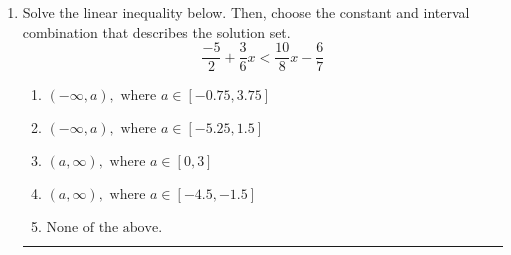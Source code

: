 \documentclass[14pt]{extbook}
\newcommand{\litem}[1]{\item#1\hspace*{-1cm}\rule{\textwidth}{0.4pt}}
\begin{document}
\begin{enumerate}
{\begin{enumerate}[label=\Alph*.]
\end{enumerate} }
\litem{
Solve the linear inequality below. Then, choose the constant and interval combination that describes the solution set.\[ \frac{-5}{2} + \frac{3}{6} x < \frac{10}{8} x - \frac{6}{7} \]\begin{enumerate}[label=\Alph*.]
\item \( (-\infty, a), \text{ where } a \in [-0.75, 3.75] \)
\item \( (-\infty, a), \text{ where } a \in [-5.25, 1.5] \)
\item \( (a, \infty), \text{ where } a \in [0, 3] \)
\item \( (a, \infty), \text{ where } a \in [-4.5, -1.5] \)
\item \( \text{None of the above}. \)

\end{enumerate} }
\end{enumerate}
\end{document}
